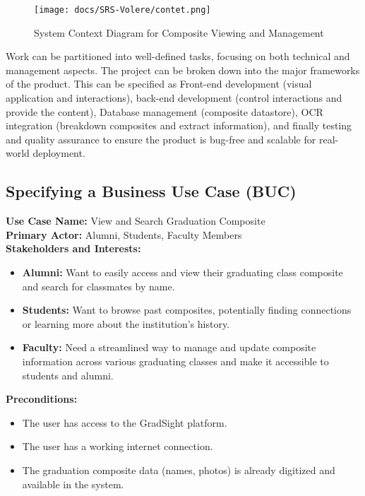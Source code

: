 \documentclass[12pt]{article}
\begin{document}
\begin{figure} %
    \centering
    \texttt{[image: docs/SRS-Volere/contet.png]}
    \caption{System Context Diagram for Composite Viewing and Management}
    \label{fig:your-label}
\end{figure}
\pagebreak

Work can be partitioned into well-defined tasks, focusing on both technical and management aspects. The project can be broken down into the major frameworks of the product. This can be specified as Front-end development (visual application and interactions), back-end development (control interactions and provide the content), Database management (composite datastore), OCR integration (breakdown composites and extract information), and finally testing and quality assurance to ensure the product is bug-free and scalable for real-world deployment.

\subsection{Specifying a Business Use Case (BUC)}

\textbf{Use Case Name:} View and Search Graduation Composite \\
\textbf{Primary Actor:} Alumni, Students, Faculty Members \\

\textbf{Stakeholders and Interests:}
\begin{itemize}
  \item \textbf{Alumni:} Want to easily access and view their graduating class composite and search for classmates by name.
  \item \textbf{Students:} Want to browse past composites, potentially finding connections or learning more about the institution’s history.
  \item \textbf{Faculty:} Need a streamlined way to manage and update composite information across various graduating classes and make it accessible to students and alumni.
\end{itemize}

\textbf{Preconditions:}
\begin{itemize}
  \item The user has access to the GradSight platform.
  \item The user has a working internet connection.
  \item The graduation composite data (names, photos) is already digitized and available in the system.
\end{itemize}
\end{document}
